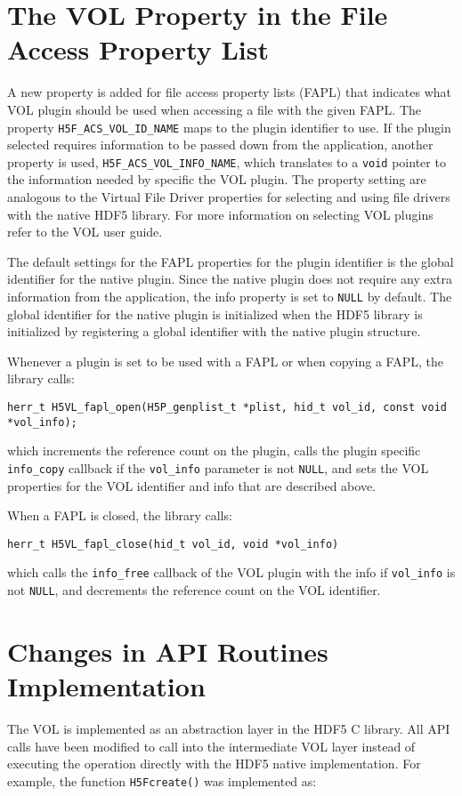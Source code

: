 \section{The VOL Property in the File Access Property List}
A new property is added for file access property lists (FAPL) that indicates what VOL plugin should be used when accessing a file with the given FAPL. The property {\tt H5F\_ACS\_VOL\_ID\_NAME} maps to the plugin identifier to use. If the plugin selected requires information to be passed down from the application, another property is used, {\tt H5F\_ACS\_VOL\_INFO\_NAME}, which translates to a {\tt void} pointer to the information needed by specific the VOL plugin. The property setting are analogous to the Virtual File Driver properties for selecting and using file drivers with the native HDF5 library. For more information on selecting VOL plugins refer to the VOL user guide.

The default settings for the FAPL properties for the plugin identifier is the global identifier for the native plugin. Since the native plugin does not require any extra information from the application, the info property is set to {\tt NULL} by default. The global identifier for the native plugin is initialized when the HDF5 library is initialized by registering a global identifier with the native plugin structure. 

Whenever a plugin is set to be used with a FAPL or when copying a FAPL, the library calls:
\begin{lstlisting}
herr_t H5VL_fapl_open(H5P_genplist_t *plist, hid_t vol_id, const void *vol_info);
\end{lstlisting}
which increments the reference count on the plugin, calls the plugin specific {\tt info\_copy} callback if the {\tt vol\_info} parameter is not {\tt NULL}, and sets the VOL properties for the VOL identifier and info that are described above.

When a FAPL is closed, the library calls:
\begin{lstlisting}
herr_t H5VL_fapl_close(hid_t vol_id, void *vol_info)
\end{lstlisting}
which calls the {\tt info\_free} callback of the VOL plugin with the info if {\tt vol\_info} is not {\tt NULL}, and decrements the reference count on the VOL identifier. 

\section{Changes in API Routines Implementation}
The VOL is implemented as an abstraction layer in the HDF5 C library. All API calls have been modified to call into the intermediate VOL layer instead of executing the operation directly with the HDF5 native implementation. For example, the function {\tt H5Fcreate()} was implemented as:


